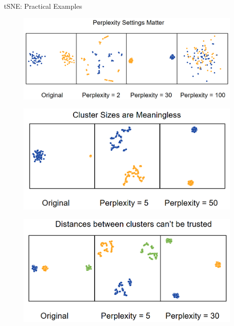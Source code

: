 \begin{frame}[allowframebreaks]{tSNE: Practical Examples}
    \begin{figure}
        \centering
        \includegraphics[width=1\textwidth,keepaspectratio]{images/dul/dim-reduce/tsne-perplexity-settings.png}
    \end{figure}

    \framebreak

    \begin{figure}
        \centering
        \includegraphics[width=1\textwidth,keepaspectratio]{images/dul/dim-reduce/tsne-perplexity-settings-2.png}
    \end{figure}

    \framebreak

    \begin{figure}
        \centering
        \includegraphics[width=1\textwidth,keepaspectratio]{images/dul/dim-reduce/tsne-perplexity-settings-3.png}
    \end{figure}
\end{frame}

